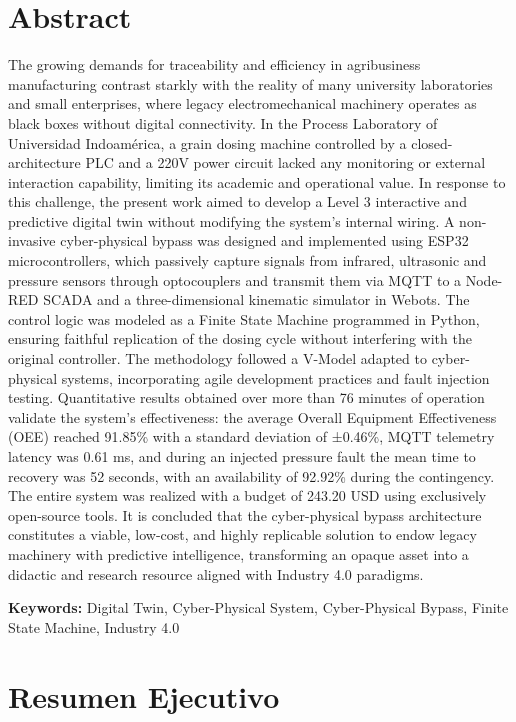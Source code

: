 \chapter*{Abstract}
The growing demands for traceability and efficiency in agribusiness manufacturing contrast starkly with the reality of many university laboratories and small enterprises, where legacy electromechanical machinery operates as black boxes without digital connectivity. In the Process Laboratory of Universidad Indoamérica, a grain dosing machine controlled by a closed-architecture PLC and a 220V power circuit lacked any monitoring or external interaction capability, limiting its academic and operational value. In response to this challenge, the present work aimed to develop a Level 3 interactive and predictive digital twin without modifying the system's internal wiring. A non-invasive cyber-physical bypass was designed and implemented using ESP32 microcontrollers, which passively capture signals from infrared, ultrasonic and pressure sensors through optocouplers and transmit them via MQTT to a Node-RED SCADA and a three-dimensional kinematic simulator in Webots. The control logic was modeled as a Finite State Machine programmed in Python, ensuring faithful replication of the dosing cycle without interfering with the original controller. The methodology followed a V-Model adapted to cyber-physical systems, incorporating agile development practices and fault injection testing. Quantitative results obtained over more than 76 minutes of operation validate the system's effectiveness: the average Overall Equipment Effectiveness (OEE) reached 91.85\% with a standard deviation of ±0.46\%, MQTT telemetry latency was 0.61 ms, and during an injected pressure fault the mean time to recovery was 52 seconds, with an availability of 92.92\% during the contingency. The entire system was realized with a budget of 243.20 USD using exclusively open-source tools. It is concluded that the cyber-physical bypass architecture constitutes a viable, low-cost, and highly replicable solution to endow legacy machinery with predictive intelligence, transforming an opaque asset into a didactic and research resource aligned with Industry 4.0 paradigms.

\textbf{Keywords:} Digital Twin, Cyber-Physical System, Cyber-Physical Bypass, Finite State Machine, Industry 4.0

\chapter*{Resumen Ejecutivo}

